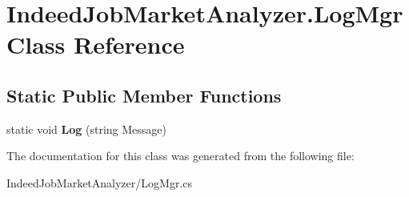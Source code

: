 \hypertarget{class_indeed_job_market_analyzer_1_1_log_mgr}{}\section{Indeed\+Job\+Market\+Analyzer.\+Log\+Mgr Class Reference}
\label{class_indeed_job_market_analyzer_1_1_log_mgr}
\subsection*{Static Public Member Functions}
\begin{DoxyCompactItemize}
\item 
\hypertarget{class_indeed_job_market_analyzer_1_1_log_mgr_a6deec31c07f1f3ffcb26fc781e2e1535}{}static void {\bfseries Log} (string Message)\label{class_indeed_job_market_analyzer_1_1_log_mgr_a6deec31c07f1f3ffcb26fc781e2e1535}

\end{DoxyCompactItemize}


The documentation for this class was generated from the following file\+:\begin{DoxyCompactItemize}
\item 
Indeed\+Job\+Market\+Analyzer/Log\+Mgr.\+cs\end{DoxyCompactItemize}
